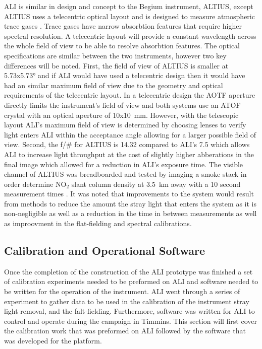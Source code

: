 \documentclass[12pt]{article}
\begin{document}
ALI is similar in design and concept to the Begium instrument, ALTIUS, except ALTIUS uses a telecentric optical layout and is designed to measure atmospheric trace gases \citep{Dekemper2012}. Trace gases have narrow absorbtion features that require higher spectral resolution. A telecentric layout will provide a constant wavelength across the whole field of view to be able to resolve absorbtion features. The optical specifications are similar between the two instruments, however two key differences will be noted. First, the field of view of ALTIUS is smaller at 5.73x5.73\si{\degree} and if ALI would have used a telecentric design then it would have had an similar maximum field of view due to the geometry and optical requirements of the telecentric layout. In a telecentric design the AOTF aperture directly limits the instrument's field of view and both systems use an ATOF crystal with an optical aperture of 10x10~mm. However, with the telescopic layout ALI's maximum field of view is determined by choosing lenses to verify light enters ALI within the acceptance angle allowing for a larger possible field of view. Second, the f/\# for ALTIUS is 14.32 compared to ALI's 7.5 which allows ALI to increase light throughput at the cost of slightly higher abberations in the final image which allowed for a reduction in ALI's exposure time. The visible channel of ALTIUS was breadboarded and tested by imaging a smoke stack in order determine NO$_{2}$ slant column density at 3.5~km away with a 10 second measurement times \citep{Dekemper2012}. It was noted that improvements to the system would result from methods to reduce the amount the stray light that enters the system as it is non-negligible as well as a reduction in the time in between measurements as well as improovment in the flat-fielding and spectral calibrations.

\subsection{Calibration and Operational Software}
\label{sec:Calibration}

Once the completion of the construction of the ALI prototype was finished a set of calibration experiments needed to be preformed on ALI and software needed to be written for the operation of the instrument. ALI went through a series of experiment to gather data to be used in the calibration of the instrument stray light removal, and the falt-fielding. Furthermore, software was written for ALI to control and operate during the campaign in Timmins. This section will first cover the calibration work that was preformed on ALI followed by the software that was developed for the platform.
\end{document}
